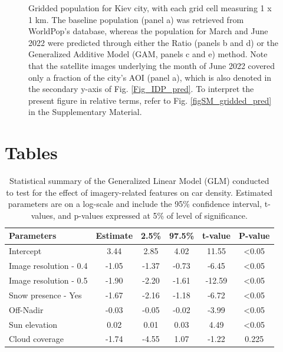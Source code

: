 \documentclass[sn-basic]{sn-jnl}%
\begin{document}
{\begin{figure}[hbtp]
\begin{center}
\end{center}
\caption{Gridded population for Kiev city, with each grid cell measuring 1 x 1 km. The baseline population (panel a) was retrieved from WorldPop's database, whereas the population for March and June 2022 were predicted through either the Ratio (panels b and d) or the Generalized Additive Model (GAM, panels c and e) method. Note that the satellite images underlying the month of June 2022 covered only a fraction of the city's AOI (panel a), which is also denoted in the secondary y-axis of Fig. \ref{Fig_IDP_pred}. To interpret the present figure in relative terms, refer to Fig. \ref{figSM_gridded_pred} in the Supplementary Material.}
\label{Fig_gridded_pred}
\end{figure}


\clearpage
\section*{Tables}\label{Tables}



\begin{table}[hbtp]
 \caption{Statistical summary of the Generalized Linear Model (GLM) conducted to test for the effect of imagery-related features on car density. Estimated parameters are on a log-scale and include the 95\% confidence interval, t-values, and p-values expressed at 5\% of level of significance. }    
\label{GLM_Table}

\begin{tabular}{lccccc}
\toprule
\multicolumn{1}{l}{\textbf{Parameters}} & \textbf{Estimate} & \textbf{2.5\%} & \textbf{97.5\%} & \textbf{t-value} & \textbf{P-value} \\ \midrule
Intercept                               & 3.44              & 2.85           & 4.02            & 11.55            & \textless 0.05   \\
Image resolution - 0.4                  & -1.05             & -1.37          & -0.73           & -6.45            & \textless 0.05   \\
Image resolution - 0.5                  & -1.90             & -2.20          & -1.61           & -12.59           & \textless 0.05   \\
Snow presence - Yes                      & -1.67             & -2.16          & -1.18           & -6.72            & \textless 0.05   \\
Off-Nadir                               & -0.03             & -0.05          & -0.02           & -3.99            & \textless 0.05   \\
Sun elevation                           & 0.02              & 0.01           & 0.03            & 4.49             & \textless 0.05   \\ 
Cloud coverage                          & -1.74             & -4.55          & 1.07            & -1.22            & 0.225            \\ \bottomrule
\end{tabular}
\end{table}


}
\end{document}
